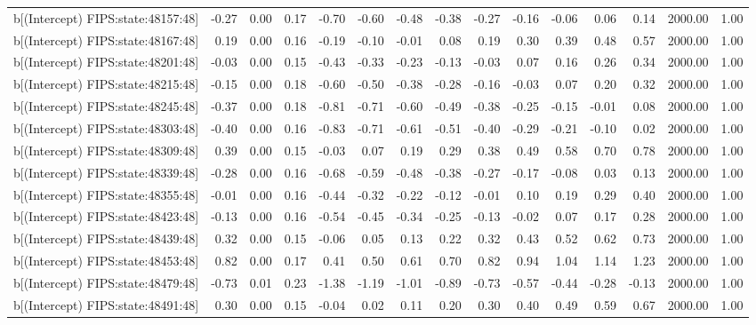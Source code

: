 \begin{table}[ht]
\begin{tabular}{rrrrrrrrrrrrrrr}
  b[(Intercept) FIPS:state:48157:48] & -0.27 & 0.00 & 0.17 & -0.70 & -0.60 & -0.48 & -0.38 & -0.27 & -0.16 & -0.06 & 0.06 & 0.14 & 2000.00 & 1.00 \\ 
  b[(Intercept) FIPS:state:48167:48] & 0.19 & 0.00 & 0.16 & -0.19 & -0.10 & -0.01 & 0.08 & 0.19 & 0.30 & 0.39 & 0.48 & 0.57 & 2000.00 & 1.00 \\ 
  b[(Intercept) FIPS:state:48201:48] & -0.03 & 0.00 & 0.15 & -0.43 & -0.33 & -0.23 & -0.13 & -0.03 & 0.07 & 0.16 & 0.26 & 0.34 & 2000.00 & 1.00 \\ 
  b[(Intercept) FIPS:state:48215:48] & -0.15 & 0.00 & 0.18 & -0.60 & -0.50 & -0.38 & -0.28 & -0.16 & -0.03 & 0.07 & 0.20 & 0.32 & 2000.00 & 1.00 \\ 
  b[(Intercept) FIPS:state:48245:48] & -0.37 & 0.00 & 0.18 & -0.81 & -0.71 & -0.60 & -0.49 & -0.38 & -0.25 & -0.15 & -0.01 & 0.08 & 2000.00 & 1.00 \\ 
  b[(Intercept) FIPS:state:48303:48] & -0.40 & 0.00 & 0.16 & -0.83 & -0.71 & -0.61 & -0.51 & -0.40 & -0.29 & -0.21 & -0.10 & 0.02 & 2000.00 & 1.00 \\ 
  b[(Intercept) FIPS:state:48309:48] & 0.39 & 0.00 & 0.15 & -0.03 & 0.07 & 0.19 & 0.29 & 0.38 & 0.49 & 0.58 & 0.70 & 0.78 & 2000.00 & 1.00 \\ 
  b[(Intercept) FIPS:state:48339:48] & -0.28 & 0.00 & 0.16 & -0.68 & -0.59 & -0.48 & -0.38 & -0.27 & -0.17 & -0.08 & 0.03 & 0.13 & 2000.00 & 1.00 \\ 
  b[(Intercept) FIPS:state:48355:48] & -0.01 & 0.00 & 0.16 & -0.44 & -0.32 & -0.22 & -0.12 & -0.01 & 0.10 & 0.19 & 0.29 & 0.40 & 2000.00 & 1.00 \\ 
  b[(Intercept) FIPS:state:48423:48] & -0.13 & 0.00 & 0.16 & -0.54 & -0.45 & -0.34 & -0.25 & -0.13 & -0.02 & 0.07 & 0.17 & 0.28 & 2000.00 & 1.00 \\ 
  b[(Intercept) FIPS:state:48439:48] & 0.32 & 0.00 & 0.15 & -0.06 & 0.05 & 0.13 & 0.22 & 0.32 & 0.43 & 0.52 & 0.62 & 0.73 & 2000.00 & 1.00 \\ 
  b[(Intercept) FIPS:state:48453:48] & 0.82 & 0.00 & 0.17 & 0.41 & 0.50 & 0.61 & 0.70 & 0.82 & 0.94 & 1.04 & 1.14 & 1.23 & 2000.00 & 1.00 \\ 
  b[(Intercept) FIPS:state:48479:48] & -0.73 & 0.01 & 0.23 & -1.38 & -1.19 & -1.01 & -0.89 & -0.73 & -0.57 & -0.44 & -0.28 & -0.13 & 2000.00 & 1.00 \\ 
  b[(Intercept) FIPS:state:48491:48] & 0.30 & 0.00 & 0.15 & -0.04 & 0.02 & 0.11 & 0.20 & 0.30 & 0.40 & 0.49 & 0.59 & 0.67 & 2000.00 & 1.00 \\ 

\end{tabular}
\end{table}
